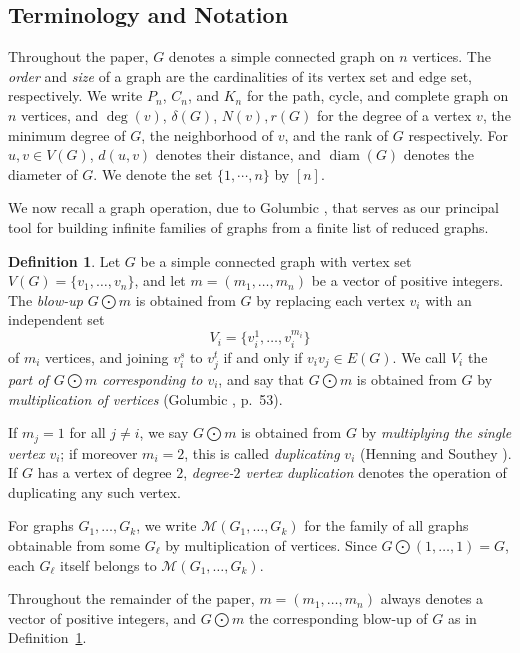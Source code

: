 \documentclass[12pt]{amsart}
\theoremstyle{plain}
\theoremstyle{definition}
\newtheorem{defn}{Definition}[section]
\begin{document}
\subsection{Terminology and Notation}

Throughout the paper, $G$ denotes a simple connected graph on $n$ vertices. The \emph{order} and \emph{size} of a graph are the cardinalities of its vertex set and edge set, respectively. We write $P_n$, $C_n$, and $K_n$ for the path, cycle, and complete graph on $n$ vertices, and $\deg(v)$, $\delta(G)$, $N(v), r(G)$ for the degree of a vertex $v$, the minimum degree of $G$, the neighborhood of $v$, and the rank of $G$ respectively. For $u,v\in V(G)$, $d(u,v)$ denotes their distance, and $\operatorname{diam}(G)$ denotes the diameter of $G$. We denote the set $\{1, \cdots, n\}$ by $[n].$

We now recall a graph operation, due to Golumbic \cite{Graph-multiplication-Golumbic}, that serves as our principal tool for building infinite families of graphs from a finite list of reduced graphs.

\begin{defn}\label{def:mult-of-vertices}
Let $G$ be a simple connected graph with vertex set $V(G)=\{v_1,\ldots,v_n\}$, and let $m=(m_1,\ldots,m_n)$ be a vector of positive integers. The \emph{blow-up} $G\bigodot m$ is obtained from $G$ by replacing each vertex $v_i$ with an independent set
\[
V_i = \{v_i^1,\ldots,v_i^{m_i}\}
\]
of $m_i$ vertices, and joining $v_i^s$ to $v_j^t$ if and only if $v_iv_j\in E(G)$. We call $V_i$ the \emph{part of $G\bigodot m$ corresponding to $v_i$}, and say that $G\bigodot m$ is obtained from $G$ by \emph{multiplication of vertices} (Golumbic \cite{Graph-multiplication-Golumbic}, p.~53).

If $m_j=1$ for all $j\ne i$, we say $G\bigodot m$ is obtained from $G$ by \emph{multiplying the single vertex $v_i$}; if moreover $m_i=2$, this is called \emph{duplicating} $v_i$ (Henning and Southey \cite{Henning-Michael}). If $G$ has a vertex of degree $2$, \emph{degree-$2$ vertex duplication} denotes the operation of duplicating any such vertex.

For graphs $G_1,\ldots,G_k$, we write $\mathcal{M}(G_1,\ldots,G_k)$ for the family of all graphs obtainable from some $G_\ell$ by multiplication of vertices. Since $G\bigodot(1,\ldots,1)=G$, each $G_\ell$ itself belongs to $\mathcal{M}(G_1,\ldots,G_k)$.
\end{defn}

Throughout the remainder of the paper, $m=(m_1,\ldots,m_n)$ always denotes a vector of positive integers, and $G\bigodot m$ the corresponding blow-up of $G$ as in Definition~\ref{def:mult-of-vertices}.
\end{document}
